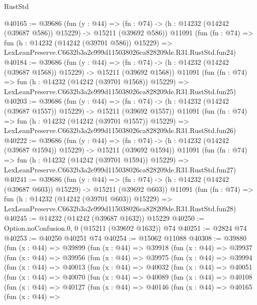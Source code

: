 \begin{lexlean}{RustStd}
\begin{coremodule}
@40165 := @39686
    (fun (y : @44) =>
    (fn : @74) -> (h : @14232 (@14242 (@39687 @586)) @15229) -> @15211 (@39692 @586))
    @11091
    (fun (fn : @74) =>
    fun (h : @14232 (@14242 (@39701 @586)) @15229) =>
    LexLeanPreserve.C6632b3a2e999d115038026ca828209de.R31.RustStd.fun24)
@40184 := @39686
    (fun (y : @44) =>
    (fn : @74) -> (h : @14232 (@14242 (@39687 @1568)) @15229) -> @15211 (@39692 @1568))
    @11091
    (fun (fn : @74) =>
    fun (h : @14232 (@14242 (@39701 @1568)) @15229) =>
    LexLeanPreserve.C6632b3a2e999d115038026ca828209de.R31.RustStd.fun25)
@40203 := @39686
    (fun (y : @44) =>
    (fn : @74) -> (h : @14232 (@14242 (@39687 @1557)) @15229) -> @15211 (@39692 @1557))
    @11091
    (fun (fn : @74) =>
    fun (h : @14232 (@14242 (@39701 @1557)) @15229) =>
    LexLeanPreserve.C6632b3a2e999d115038026ca828209de.R31.RustStd.fun26)
@40222 := @39686
    (fun (y : @44) =>
    (fn : @74) -> (h : @14232 (@14242 (@39687 @1594)) @15229) -> @15211 (@39692 @1594))
    @11091
    (fun (fn : @74) =>
    fun (h : @14232 (@14242 (@39701 @1594)) @15229) =>
    LexLeanPreserve.C6632b3a2e999d115038026ca828209de.R31.RustStd.fun27)
@40241 := @39686
    (fun (y : @44) =>
    (fn : @74) -> (h : @14232 (@14242 (@39687 @603)) @15229) -> @15211 (@39692 @603))
    @11091
    (fun (fn : @74) =>
    fun (h : @14232 (@14242 (@39701 @603)) @15229) =>
    LexLeanPreserve.C6632b3a2e999d115038026ca828209de.R31.RustStd.fun28)
@40245 := @14232 (@14242 (@39687 @1632)) @15229
@40250 := Option.noConfusion.{0, 0} (@15211 (@39692 @1632)) @74
@40251 := @2824 @74
@40253 := @40250 @40251 @74
@40254 := @15062 @11088
@40308 := @39880
    (fun (x : @44) =>
    @39899
      (fun (x : @44) =>
      @39918
        (fun (x : @44) =>
        @39937
          (fun (x : @44) =>
          @39956
            (fun (x : @44) =>
            @39975
              (fun (x : @44) =>
              @39994
                (fun (x : @44) =>
                @40013
                  (fun (x : @44) =>
                  @40032
                    (fun (x : @44) =>
                    @40051
                      (fun (x : @44) =>
                      @40070
                        (fun (x : @44) =>
                        @40089
                          (fun (x : @44) =>
                          @40108
                            (fun (x : @44) =>
                            @40127
                              (fun (x : @44) =>
                              @40146
                                (fun (x : @44) =>
                                @40165
                                  (fun (x : @44) =>

\end{coremodule}
\end{lexlean}
